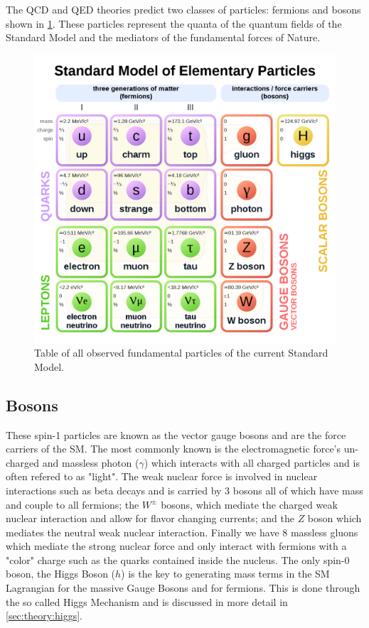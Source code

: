 The QCD and QED theories predict two classes of particles: fermions and bosons
shown in \cref{fig:standard_model}. These particles represent the quanta
of the quantum fields of the Standard Model and the mediators of the fundamental
forces of Nature.

\begin{figure}[!htbp]
  \begin{center}
    \includegraphics[width=0.8\linewidth]{figures/theory/standard_model.png}
    \caption{ Table of all observed fundamental particles of the current
Standard Model.}
    \label{fig:standard_model}
  \end{center}
\end{figure}

\subsection{Bosons} \label{sec:theory:bosons}

These spin-1 particles are known as the vector gauge bosons and are the
force carriers of the SM.  The most commonly known is the electromagnetic
force's un-charged and massless photon ($\gamma$) which interacts with all
charged particles and is often refered to as "light".  The weak nuclear force is
involved in nuclear interactions such as beta decays and is carried by 3 bosons
all of which have mass and couple to all fermions; the $W^{\pm}$ bosons, which
mediate the charged weak nuclear interaction and allow for flavor changing
currents; and the $Z$ boson which mediates the neutral weak nuclear interaction.
Finally we have 8 massless gluons which mediate the strong nuclear force and
only interact with fermions with a "color" charge such as the quarks contained
inside the nucleus. The only spin-0 boson, the Higgs Boson ($h$) is the key to
generating mass terms in the SM Lagrangian for the massive Gauge Bosons and for
fermions.  This is done through the so called Higgs Mechanism and is discussed
in more detail in \cref{sec:theory:higgs}.

